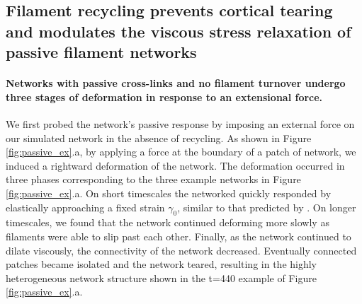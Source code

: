 \documentclass[10pt,letterpaper]{article}
\begin{document}
\subsection*{Filament recycling prevents cortical tearing and modulates the viscous stress relaxation of passive filament networks}
 
\paragraph{Networks with passive cross-links and no filament turnover undergo three stages of deformation in response to an extensional force.} We first probed the network's passive response by imposing an external force on our simulated network in the absence of recycling.   As shown in Figure \ref{fig:passive_ex}.a, by applying a force at the boundary of a patch of network, we induced a rightward deformation of the network.  The deformation occurred in three phases corresponding to the three example networks in Figure \ref{fig:passive_ex}.a.  On short timescales the networked quickly responded by elastically approaching a fixed strain $\gamma_0$, similar to that predicted by \cite{theo_hlm}.  On longer timescales, we found that the network continued deforming more slowly as filaments were able to slip past each other.  Finally, as the network continued to dilate viscously, the connectivity of the network decreased.  Eventually connected patches became isolated and the network teared, resulting in the highly heterogeneous network structure shown in the t=440 example of Figure \ref{fig:passive_ex}.a.  
\end{document}
